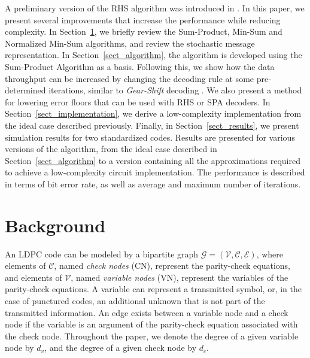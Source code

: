 \documentclass[12pt,journal,twoside,draftcls,onecolumn]{IEEEtran}
\begin{document}
A preliminary version of the RHS algorithm was introduced in \cite{leduc-primeau:2009}. In this paper, we present several improvements that increase the performance while reducing complexity.
In Section~\ref{sect_background}, we briefly review the Sum-Product, Min-Sum and Normalized Min-Sum algorithms, and review the stochastic message representation.
In Section~\ref{sect_algorithm}, the algorithm is developed using the Sum-Product Algorithm as a basis. Following this, we show how the data throughput can be increased by changing the decoding rule at some pre-determined iterations, similar to \emph{Gear-Shift} decoding \cite{ardakani:2006}. We also present a method for lowering error floors that can be used with RHS or SPA decoders.
In Section~\ref{sect_implementation}, we derive a low-complexity implementation from the ideal case described previously.
Finally, in Section~\ref{sect_results}, we present simulation results for two standardized codes.
Results are presented for various versions of the algorithm, from the ideal case described in Section~\ref{sect_algorithm} to a version containing all the approximations required to achieve a low-complexity circuit implementation. The performance is described in terms of bit error rate, as well as average and maximum number of iterations.


\section{Background}
\label{sect_background}

An LDPC code can be modeled by a bipartite graph $\mathcal{G} = (\mathcal{V}, \mathcal{C}, \mathcal{E})$, where elements of $\mathcal{C}$, named \emph{check nodes} (CN), represent the parity-check equations, and elements of $\mathcal{V}$, named \emph{variable nodes} (VN), represent the variables of the parity-check equations. A variable can represent a transmitted symbol, or, in the case of punctured codes, an additional unknown that is not part of the transmitted information. An edge exists between a variable node and a check node if the variable is an argument of the parity-check equation associated with the check node. 
Throughout the paper, we denote the degree of a given variable node by $d_v$, and the degree of a given check node by $d_c$.
\end{document}
